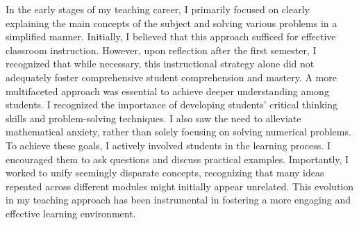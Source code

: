 \documentclass[11pt]{article}
\newcommand{\ignore}[1]{}
\begin{document}
In the early stages of my teaching career, I primarily focused on clearly explaining the main concepts of the subject and solving various problems in a simplified manner. Initially, I believed that this approach sufficed for effective classroom instruction. However, upon reflection after the first semester, I recognized that while necessary, this instructional strategy alone did not adequately foster comprehensive student comprehension and mastery. A more multifaceted approach was essential to achieve deeper understanding among students.
I recognized the importance of developing students' critical thinking skills and problem-solving techniques. I also saw the need to alleviate mathematical anxiety, %
rather than solely focusing on solving numerical problems.
To achieve these goals, I actively involved students in the learning process. I encouraged them to ask questions and discuss  practical \ignore{, real-world} examples. Importantly, I worked to unify seemingly disparate concepts, recognizing that many ideas repeated across different modules might initially appear unrelated.
This evolution in my teaching approach has been instrumental in fostering a more engaging and effective learning environment.


\end{document}
